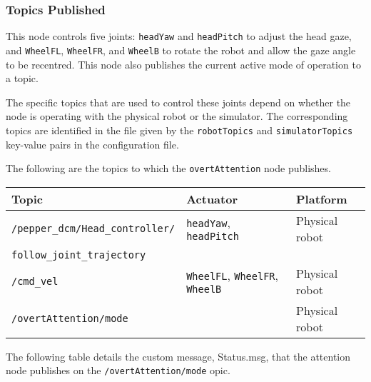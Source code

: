 \documentclass{CSSRforAfrica}
\begin{document}
\subsubsection*{Topics Published}
This node controls five joints: {\small \verb+headYaw+} and  {\small \verb+headPitch+}  to adjust the head gaze, and {\small \verb+WheelFL+},  {\small \verb+WheelFR+}, and  {\small \verb+WheelB+} to rotate the robot and allow the gaze angle to be recentred. This node also publishes the current active mode of operation to a topic.

The specific topics that are used to control these joints depend on whether the node is operating with the physical robot or the simulator.  The corresponding topics are  identified in the file given by the {\small \verb+robotTopics+ }    and {\small \verb+simulatorTopics+ }   key-value pairs in the configuration file.

The following are the topics to which the {\small \verb+overtAttention+} node publishes.

\begin{center}
	\begin{tabularx}{\linewidth}{| l | l | X|}
		\hline 
		{\small Topic }                                                                                & {\small Actuator }    &  {\small Platform}       \\
		\hline
		{\footnotesize \verb+/pepper_dcm/Head_controller/+ }  & {\footnotesize \verb+headYaw+,   \verb+headPitch+ } & {\small Physical robot} \\ 
		{\footnotesize \verb+follow_joint_trajectory+ }                &                                                                                      &  \\ 
		\hline
		{\footnotesize \verb+/cmd_vel+ }                                               &    {\footnotesize \verb+WheelFL+},  {\footnotesize \verb+WheelFR+},   {\footnotesize \verb+WheelB+} & {\small Physical robot} \\ 
		\hline
		{\footnotesize \verb+/overtAttention/mode+ }                                &   & {\small Physical robot} \\ 
		\hline
	\end{tabularx}
\end{center}

The following table details the custom message, Status.msg, that the attention node publishes on the {\footnotesize \verb+/overtAttention/mode+} opic.
\end{document}
